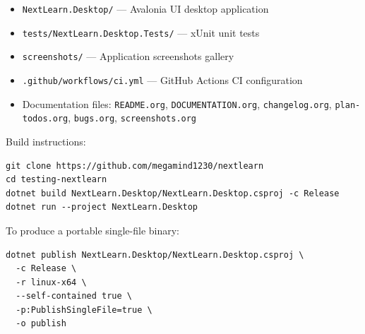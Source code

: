 \documentclass[14pt]{article}
\begin{document}
\begin{itemize}
\item \texttt{NextLearn.Desktop/} — Avalonia UI desktop application
\item \texttt{tests/NextLearn.Desktop.Tests/} — xUnit unit tests
\item \texttt{screenshots/} — Application screenshots gallery
\item \texttt{.github/workflows/ci.yml} — GitHub Actions CI configuration
\item Documentation files: \texttt{README.org}, \texttt{DOCUMENTATION.org},
\texttt{changelog.org}, \texttt{plan-todos.org}, \texttt{bugs.org}, \texttt{screenshots.org}
\end{itemize}

Build instructions:
\begin{verbatim}
git clone https://github.com/megamind1230/nextlearn
cd testing-nextlearn
dotnet build NextLearn.Desktop/NextLearn.Desktop.csproj -c Release
dotnet run --project NextLearn.Desktop
\end{verbatim}

To produce a portable single-file binary:
\begin{verbatim}
dotnet publish NextLearn.Desktop/NextLearn.Desktop.csproj \
  -c Release \
  -r linux-x64 \
  --self-contained true \
  -p:PublishSingleFile=true \
  -o publish
\end{verbatim}
\end{document}
